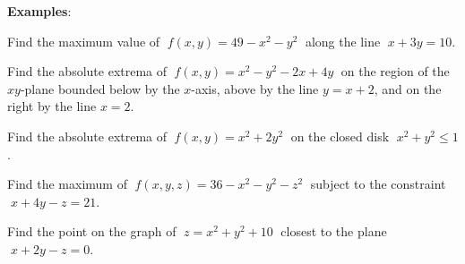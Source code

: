 \documentclass[12pt,fleqn]{article}
\def\egs#1{{\bf Examples}: #1}
\begin{document}
\vspace{0.1in}
\ni
\egs{}
\be
\item
  Find the maximum value of $\;f(x,y) = 49 - x^2 - y^2\;$ along the
  line $\; x + 3y = 10$.

\item
  Find the absolute extrema of
  $\;f(x,y) = x^2 - y^2 - 2x + 4y\;$ on the region of the $xy$-plane
  bounded below by the $x$-axis, above by the line $y = x+2$,
  and on the right by the line $x=2$.

\item
  Find the absolute extrema of
  $\;f(x,y) = x^2 + 2y^2\;$ on the closed disk $\;x^2 + y^2 \le 1$.

\item
  Find the maximum of $\;f(x,y,z) = 36 - x^2 - y^2 - z^2\;$ subject
  to the constraint $\;x + 4y - z = 21$.

\item
  Find the point on the graph of $\; z = x^2 + y^2 + 10\;$ closest
  to the plane $\; x + 2y - z = 0$.
\ee
\end{document}
